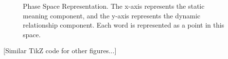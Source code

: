 \documentclass{article}
\begin{document}
\begin{figure}[h]
\caption{Phase Space Representation. The x-axis represents the static meaning component, and the y-axis represents the dynamic relationship component. Each word is represented as a point in this space.}
\end{figure}

[Similar TikZ code for other figures...]
\end{document}
